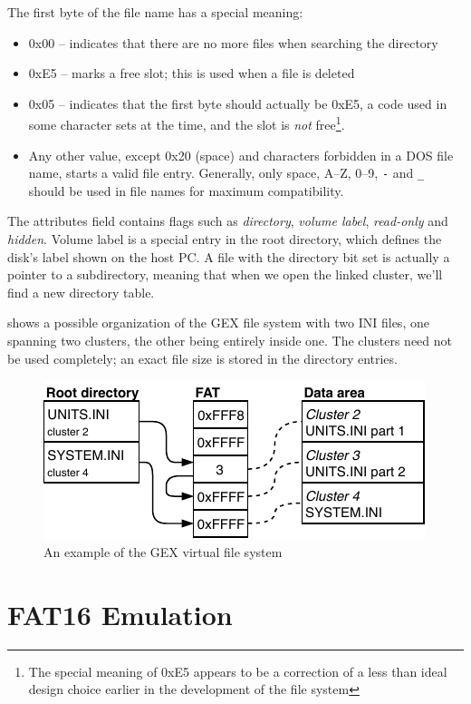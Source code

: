 \noindent
The first byte of the file name has a special meaning:

\begin{itemize}
	\item 0x00 -- indicates that there are no more files when searching the directory
	\item 0xE5 -- marks a free slot; this is used when a file is deleted
	\item 0x05 -- indicates that the first byte should actually be 0xE5, a code used in some character sets at the time, and the slot is \textit{not} free\footnote{The special meaning of 0xE5 appears to be a correction of a less than ideal design choice earlier in the development of the file system}.
	\item Any other value, except 0x20 (space) and characters forbidden in a DOS file name, starts a valid file entry. Generally, only space, A--Z, 0--9, \verb|-| and \verb|_| should be used in file names for maximum compatibility.
\end{itemize}

The attributes field contains flags such as \textit{directory}, \textit{volume label}, \textit{read-only} and \textit{hidden}. Volume label is a special entry in the root directory, which defines the disk's label shown on the host \gls{PC}. A file with the directory bit set is actually a pointer to a subdirectory, meaning that when we open the linked cluster, we'll find a new directory table.

 shows a possible organization of the GEX file system with two INI files, one spanning two clusters, the other being entirely inside one. The clusters need not be used completely; an exact file size is stored in the directory entries.

\begin{figure}[h]
	\centering
	\includegraphics[scale=1.3] {img/fat-links.pdf}
	\caption{\label{fig:fat-example}An example of the GEX virtual file system}
\end{figure}


\section{FAT16 Emulation}


